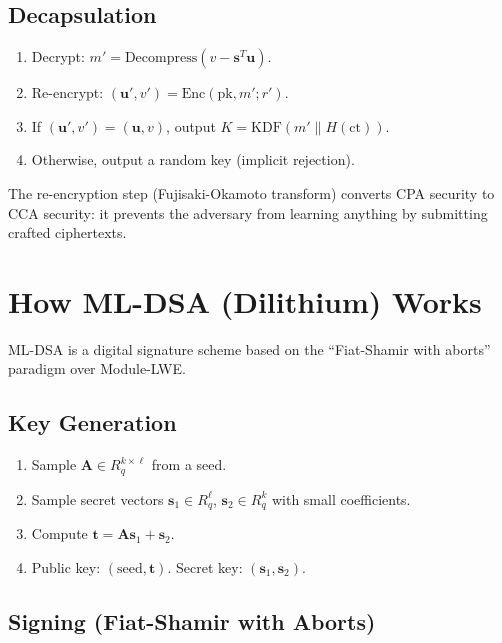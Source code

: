 \documentclass[11pt,a4paper]{article}
\begin{document}
\subsection{Decapsulation}

\begin{enumerate}[nosep]
  \item Decrypt: $m' = \text{Decompress}(v - \mathbf{s}^T \mathbf{u})$.
  \item Re-encrypt: $(\mathbf{u}', v') = \text{Enc}(\text{pk}, m'; r')$.
  \item If $(\mathbf{u}', v') = (\mathbf{u}, v)$, output $K = \text{KDF}(m' \| H(\text{ct}))$.
  \item Otherwise, output a random key (implicit rejection).
\end{enumerate}

The re-encryption step (Fujisaki-Okamoto transform) converts CPA security to CCA
security: it prevents the adversary from learning anything by submitting crafted
ciphertexts.

\section{How ML-DSA (Dilithium) Works}

ML-DSA is a digital signature scheme based on the ``Fiat-Shamir with aborts'' paradigm
over Module-LWE.

\subsection{Key Generation}

\begin{enumerate}[nosep]
  \item Sample $\mathbf{A} \in R_q^{k \times \ell}$ from a seed.
  \item Sample secret vectors $\mathbf{s}_1 \in R_q^\ell$, $\mathbf{s}_2 \in R_q^k$
    with small coefficients.
  \item Compute $\mathbf{t} = \mathbf{A}\mathbf{s}_1 + \mathbf{s}_2$.
  \item Public key: $(\text{seed}, \mathbf{t})$. Secret key: $(\mathbf{s}_1, \mathbf{s}_2)$.
\end{enumerate}

\subsection{Signing (Fiat-Shamir with Aborts)}
\end{document}

